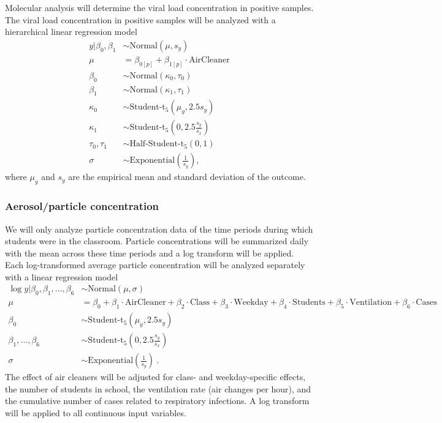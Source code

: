 \documentclass{article}
\begin{document}
Molecular analysis will determine the viral load concentration in positive samples. The viral load concentration in positive samples will be analyzed with a hierarchical linear regression model 
\begin{align*}
    y | \beta_0, \beta_1 &\sim \text{Normal}(\mu,s_{y}) \\
    \mu &= \beta_{0[p]} + \beta_{1[p]} \cdot \text{AirCleaner} \\
    \beta_0 &\sim \text{Normal}(\kappa_0, \tau_0) \\
    \beta_1 &\sim \text{Normal}(\kappa_1, \tau_1) \\
    \kappa_0 &\sim \text{Student-t}_5(\mu_{y}, 2.5s_{y}) \\
    \kappa_1 &\sim \text{Student-t}_5\left(0, 2.5\frac{s_{y}}{s_{x}}\right) \\
    \tau_0, \tau_1 &\sim \text{Half-Student-t}_5(0,1) \\
    \sigma &\sim \text{Exponential}\left(\frac{1}{s_{y}}\right),
\end{align*}
where $\mu_{y}$ and $s_{y}$ are the empirical mean and standard deviation of the outcome. 

\subsubsection{Aerosol/particle concentration}\label{subsubsec:aerosol}

We will only analyze particle concentration data of the time periods during which students were in the classroom. Particle concentrations will be summarized daily with the mean across these time periods and a log transform will be applied. Each log-transformed average particle concentration will be analyzed separately with a linear regression model 
\begin{align*}
    \log y | \beta_0, \beta_1, \dots, \beta_6 &\sim \text{Normal}(\mu,\sigma) \\
    \mu &= \beta_0 + \beta_1 \cdot \text{AirCleaner} + \beta_2 \cdot \text{Class} + \beta_3 \cdot \text{Weekday} + \beta_4 \cdot \text{Students} + \beta_5 \cdot \text{Ventilation} + \beta_6 \cdot \text{Cases}\\
    \beta_0 &\sim \text{Student-t}_5(\mu_y, 2.5s_{y}) \\
    \beta_1, \dots, \beta_6 &\sim \text{Student-t}_5\left(0, 2.5\frac{s_{y}}{s_{x}}\right) \\
    \sigma &\sim \text{Exponential}\left(\frac{1}{s_{y}}\right)~.
\end{align*}
The effect of air cleaners will be adjusted for class- and weekday-specific effects, the number of students in school, the ventilation rate (air changes per hour), and the cumulative number of cases related to respiratory infections. A log transform will be applied to all continuous input variables. 
\end{document}
